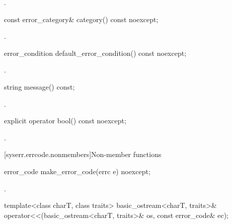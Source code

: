 \begin{itemdescr}
\pnum
\returns
{}.
\end{itemdescr}

%
\begin{itemdecl}
const error_category& category() const noexcept;
\end{itemdecl}

\begin{itemdescr}
\pnum
\returns
{}.
\end{itemdescr}

%
\begin{itemdecl}
error_condition default_error_condition() const noexcept;
\end{itemdecl}

\begin{itemdescr}
\pnum
\returns
{}.
\end{itemdescr}

%
\begin{itemdecl}
string message() const;
\end{itemdecl}

\begin{itemdescr}
\pnum
\returns
{}.
\end{itemdescr}

%
\begin{itemdecl}
explicit operator bool() const noexcept;
\end{itemdecl}

\begin{itemdescr}
\pnum
\returns
{}.
\end{itemdescr}

[syserr.errcode.nonmembers]{Non-member functions}

%
\begin{itemdecl}
error_code make_error_code(errc e) noexcept;
\end{itemdecl}

\begin{itemdescr}
\pnum
\returns
{}.
\end{itemdescr}

%
\begin{itemdecl}
template<class charT, class traits>
  basic_ostream<charT, traits>& operator<<(basic_ostream<charT, traits>& os, const error_code& ec);
\end{itemdecl}

